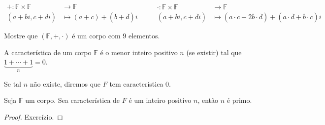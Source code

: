 \[
	\begin{aligned}
		+\colon\mathbb{F}\times\mathbb{F} & \longrightarrow\mathbb{F} \\
		\left(
		\overline{a}+\overline{b}i,
		\overline{c}+\overline{d}i
		\right)                           & \longmapsto
		\left(\overline{a}+\overline{c}\right)+
		\left(\overline{b}+\overline{d}\right)i
	\end{aligned}\qquad
	\begin{aligned}
		\cdot\colon\mathbb{F}\times\mathbb{F} & \longrightarrow\mathbb{F}
		\\
		\left(
		\overline{a}+\overline{b}i,
		\overline{c}+\overline{d}i
		\right)                               & \longmapsto
		\left(
		\overline{a}\cdot\overline{c}+
		2\overline{b}\cdot\overline{d}
		\right)+
		\left(
		\overline{a}\cdot\overline{d}+
		\overline{b}\cdot\overline{c}
		\right)i
	\end{aligned}
\]

Mostre que $\left(\mathbb{F},+,\cdot\right)$ é um corpo com $9$
elementos.

\begin{definition}
	A característica de um corpo $\mathbb{F}$ é o menor inteiro
	positivo $n$ (se existir) tal que $\underbrace{1+\dotsb+1}_{n}=0$.

	Se tal $n$ não existe, diremos que $F$ tem característica $0$.
\end{definition}

\begin{proposition}
	Seja $\mathbb{F}$ um corpo.
	Sea característica de $F$ é um inteiro positivo $n$, então $n$ é primo.
\end{proposition}

\begin{proof}
	Exercízio.
\end{proof}

